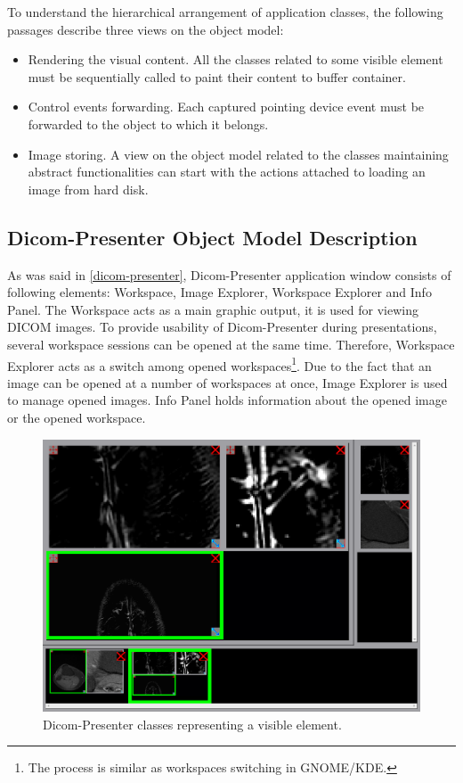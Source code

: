 To understand the hierarchical arrangement of application classes, the following passages describe three views on the object model:

\begin{itemize}
\item Rendering the visual content. All the classes related to some visible element must be sequentially called to paint their content to buffer container.
\item Control events forwarding. Each captured pointing device event must be forwarded to the object to which it belongs.
\item Image storing. A view on the object model related to the classes maintaining abstract functionalities can start with the actions attached to loading an image from hard disk.
\end{itemize}

\subsection{Dicom-Presenter Object Model Description}
As was said in \ref{dicom-presenter}, Dicom-Presenter application window consists of following elements:  Workspace, Image Explorer, Workspace Explorer and Info Panel. The Workspace acts as a main graphic output, it is used for viewing DICOM images. To provide usability of Dicom-Presenter during presentations, several workspace sessions can be opened at the same time. Therefore, Workspace Explorer acts as a switch among opened workspaces\footnote{The process is similar as workspaces switching in GNOME/KDE.}. Due to the fact that an image can be opened at a number of workspaces at once, Image Explorer is used to manage opened images. Info Panel holds information about the opened image or the opened workspace.

\begin{figure}
	\caption{Dicom-Presenter classes representing a visible element.}
	\begin{center}
	\includegraphics[width=\textwidth]{Text/IMG/dicom-presenter-gui.png}
	\end{center}
	\label{paint}
\end{figure}

